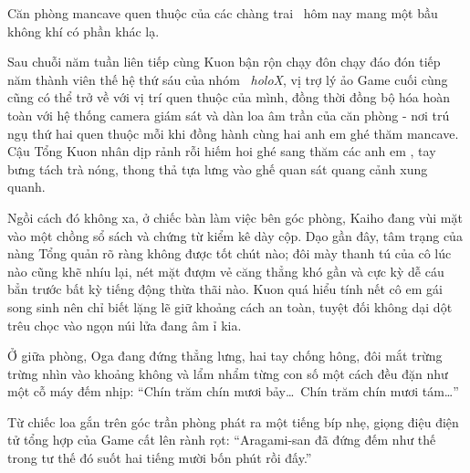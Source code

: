 \documentclass[../main.tex]{subfiles}
\begin{document}

Căn phòng mancave quen thuộc của các chàng trai \hls\ hôm nay mang một bầu không khí có phần khác lạ.

Sau chuỗi năm tuần liên tiếp cùng Kuon bận rộn chạy đôn chạy đáo đón tiếp năm thành viên thế hệ thứ sáu của nhóm \hll\ \textit{holoX}, vị trợ lý ảo Game cuối cùng cũng có thể trở về với vị trí quen thuộc của mình, đồng thời đồng bộ hóa hoàn toàn với hệ thống camera giám sát và dàn loa âm trần của căn phòng - nơi trú ngụ thứ hai quen thuộc mỗi khi đồng hành cùng hai anh em ghé thăm mancave. Cậu Tổng Kuon nhân dịp rảnh rỗi hiếm hoi ghé sang thăm các anh em \hls, tay bưng tách trà nóng, thong thả tựa lưng vào ghế quan sát quang cảnh xung quanh.

Ngồi cách đó không xa, ở chiếc bàn làm việc bên góc phòng, Kaiho đang vùi mặt vào một chồng sổ sách và chứng từ kiểm kê dày cộp. Dạo gần đây, tâm trạng của nàng Tổng quản rõ ràng không được tốt chút nào; đôi mày thanh tú của cô lúc nào cũng khẽ nhíu lại, nét mặt đượm vẻ căng thẳng khó gần và cực kỳ dễ cáu bẳn trước bất kỳ tiếng động thừa thãi nào. Kuon quá hiểu tính nết cô em gái song sinh nên chỉ biết lặng lẽ giữ khoảng cách an toàn, tuyệt đối không dại dột trêu chọc vào ngọn núi lửa đang âm ỉ kia.

Ở giữa phòng, Oga đang đứng thẳng lưng, hai tay chống hông, đôi mắt trừng trừng nhìn vào khoảng không và lẩm nhẩm từng con số một cách đều đặn như một cỗ máy đếm nhịp: ``Chín trăm chín mươi bảy\dots\ Chín trăm chín mươi tám\dots''

Từ chiếc loa gắn trên góc trần phòng phát ra một tiếng bíp nhẹ, giọng điệu điện tử tổng hợp của Game cất lên rành rọt: ``Aragami-san đã đứng đếm như thế trong tư thế đó suốt hai tiếng mười bốn phút rồi đấy.''
\end{document}
